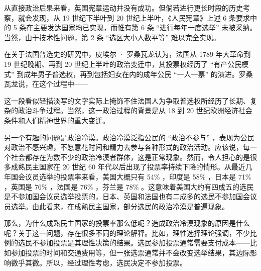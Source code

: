 从直接政治后果来看，英国宪章运动并没有成功。但倘若进行更长时段的历史考察，就会发现，从 19 世纪下半叶到 20 世纪上半叶，《人民宪章》上述 6 条要求中的 5 条在主要发达国家均已实现，而惟有第 6 条 “进行每年一度选举” 未被采纳。当然，由于技术性问题，第 2 条 “选区大小人数平等” 难以完全实现。

在关于法国普选史的研究中，皮埃尔 · 罗桑瓦龙认为，法国从 1789 年大革命到 19 世纪晚期、再到 20 世纪上半叶的政治变迁中，其投票权经历了 “有产公民模式” 到成年男子普选权，再到包括妇女在内的成年公民 “一人一票” 的演进。罗桑瓦龙说，在这个过程中——


这一段看似轻描淡写的文字实际上掩饰不住法国人为争取普选权所经历了长期、复杂的政治斗争过程。当然，这一政治过程的背景是从 18 到 20 世纪欧洲经济社会条件和人们精神世界的重大变迁。


另一个有趣的问题是政治冷漠。政治冷漠泛指公民的 “政治不参与” ，表现为公民对政治不感兴趣，不愿意花时间和精力去参与各种形式的政治活动。应该说，每一个社会都存在为数不少的政治冷漠者群体，这是正常现象。然而，令人担心的是很多成熟民主国家在 20 世纪 60 年代以后出现了投票率持续下降的情形。从最近几年国会议员选举的投票率来看，美国大概只有 54\% ，印度是 58\% ，日本是 71\% ，英国是 76\% ，法国是 76\% ，芬兰是 78\% 。这意味着美国大约有四成五的选民是不参加国会议员选举投票的，日本、英国和法国也有二成多的选民不参加国会议员选举。由此看来，在成熟民主国家，部分选民的政治冷漠是普遍现象。

那么，为什么成熟民主国家的投票率那么低呢？造成政治冷漠现象的原因是什么呢？关于这一问题，存在很多不同的理论解释。比如，理性选择理论强调，不少比例的选民不参加投票是其理性决策的结果。选民参加投票通常需要支付成本——比如参加投票的时间和交通费用等，但一张选票通常并不会改变选举结果，其边际影响微乎其微。所以，经过理性考虑，选民决定不参加投票。

